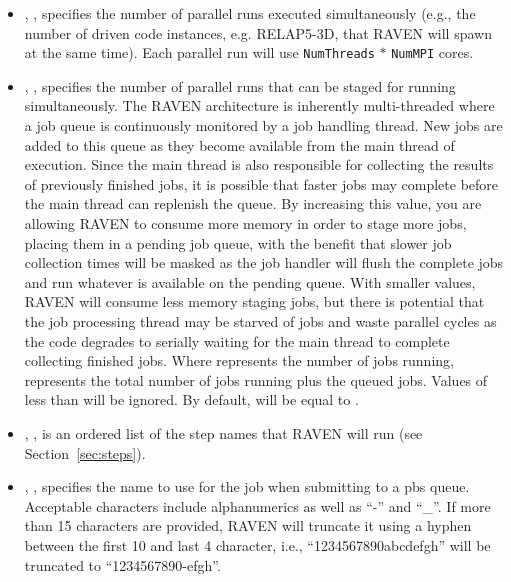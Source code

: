 \begin{itemize}
\item {}, ,
  specifies the number of parallel runs executed simultaneously (e.g.,
  the number of driven code instances, e.g. RELAP5-3D, that RAVEN will
  spawn at the same time).  Each parallel run will use
  \texttt{NumThreads} $*$ \texttt{NumMPI} cores.
%

\item {}, ,
  specifies the number of parallel runs that can be staged for running
  simultaneously.
  The RAVEN architecture is inherently multi-threaded where a job queue is
  continuously monitored by a job handling thread.
  New jobs are added to this queue as they become available from the main thread
  of execution.
  Since the main thread is also responsible for collecting the results of
  previously finished jobs, it is possible that faster jobs may complete before
  the main thread can replenish the queue.
  By increasing this value, you are allowing RAVEN to consume more memory
  in order to stage more jobs, placing them in a pending job queue, with the
  benefit that slower job collection times will be masked as the job handler
  will flush the complete jobs and run whatever is available on the pending
  queue.
  With smaller values, RAVEN will consume less memory staging jobs, but there is
  potential that the job processing thread may be starved of jobs and waste
  parallel cycles as the code degrades to serially waiting for the main thread
  to complete collecting finished jobs.
  Where  represents the number of jobs running,
   represents the total number of jobs running plus the
  queued jobs. Values of  less than 
  will be ignored. By default,  will be equal to
  .

\item {}, , is
an ordered list of the step names that RAVEN will run (see
Section~\ref{sec:steps}).

\item {}, , specifies
the name to use for the job when submitting to a pbs queue.  Acceptable characters
include alphanumerics as well as ``-'' and ``\_''.  If more than 15
characters are provided, RAVEN will truncate it using a hyphen between the first
10 and last 4 character, i.e., ``1234567890abcdefgh'' will be truncated to
``1234567890-efgh''.
%


\end{itemize}
